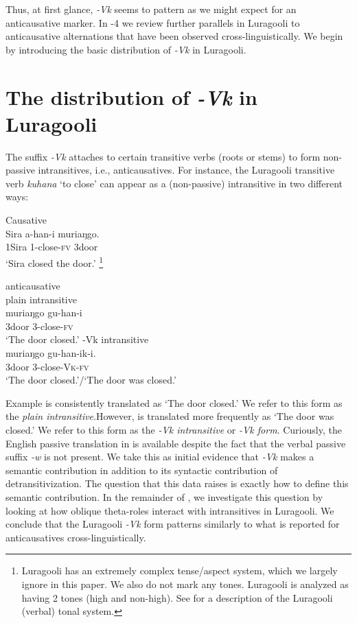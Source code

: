 \documentclass[output=paper]{langsci/langscibook}
\begin{document}
Thus, at first glance, \textit{-Vk} seems to pattern as we might expect for an anticausative marker. In -4 we review further parallels in Luragooli to anticausative alternations that have been observed cross-linguistically. We begin  by introducing the basic distribution of \textit{-Vk} in Luragooli.

\section{The distribution of \textit{-Vk} in Luragooli}\label{sec:gluckman:3}

The suffix \textit{-Vk} attaches to certain transitive verbs (roots or stems) to form non-passive intransitives, i.e., anticausatives. For instance, the Luragooli transitive verb \textit{kuhana} ‘to close’ can appear as a (non-passive) intransitive in two different ways:

\ea\label{ex:gluckman:4}{Causative}\\
\gll Sira    a-han-i      muriaŋgo.      \\
     1Sira 1-close-\textsc{fv}  3door\\
\glt ‘Sira closed the door.’
\footnote{Luragooli has an extremely complex tense/aspect system, which we largely ignore in this paper. We also do not mark any tones. Luragooli is analyzed as having 2 tones (high and non-high). See \citet{SamuelsPaster2015} for a description of the Luragooli (verbal) tonal system.}
\z

\ea\label{ex:gluckman:5} 
{anticausative}\\
\ea\label{ex:gluckman:5a}{plain intransitive}\\ 
\gll muriaŋgo gu-han-i       \\
       3door       3-close-\textsc{fv}\\ 
\glt ‘The door closed.’
\ex\label{ex:gluckman:5b}{-\textup{Vk} intransitive}\\ 
\gll muriaŋgo gu-han-ik-i.       \\
       3door         3-close-\textsc{Vk}-\textsc{fv}\\
\glt ‘The door closed.’/‘The door was closed.’
\z
\z

Example  is consistently translated as ‘The door closed.’ We refer to this form as the \textit{plain intransitive}.However,  is translated more frequently as ‘The door was closed.’ We refer to this form as the \textit{-Vk intransitive} or \textit{-Vk form}. Curiously, the English passive translation in  is available despite the fact that the verbal passive suffix \textit{-w} is not present. We take this as initial evidence that \textit{-Vk} makes a semantic contribution in addition to its syntactic contribution of detransitivization. The question that this data raises is exactly how to define this semantic contribution. In the remainder of , we investigate this question by looking at how oblique theta-roles interact with intransitives in Luragooli. We conclude that the Luragooli \textit{-Vk} form patterns similarly to what is reported for anticausatives cross-linguistically.
\end{document}
